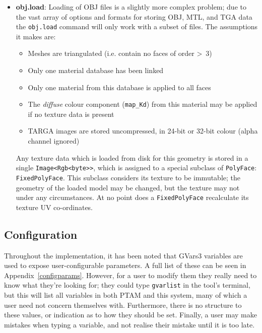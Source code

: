 \documentclass[a4paper,10pt]{article}
\begin{document}
\begin{itemize}
\item{\textbf{obj.load}: Loading of OBJ files is a slightly more complex problem; due to the vast array of options and formats for storing OBJ, MTL, and TGA data the \texttt{obj.load} command will only work with a subset of files. The assumptions it makes are:
\begin{itemize}
\item{Meshes are triangulated (i.e. contain no faces of order \textgreater~3)}
\item{Only one material database has been linked}
\item{Only one material from this database is applied to all faces}
\item{The \textit{diffuse} colour component (\texttt{map\_Kd}) from this material may be applied if no texture data is present}
\item{TARGA images are stored uncompressed, in 24-bit or 32-bit colour (alpha channel ignored)}
\end{itemize}

Any texture data which is loaded from disk for this geometry is stored in a single \texttt{Image\textless Rgb\textless byte\textgreater \textgreater}, which is assigned to a special subclass of \texttt{PolyFace}: \texttt{FixedPolyFace}. This subclass considers its texture to be immutable; the geometry of the loaded model may be changed, but the texture may not under any circumstances. At no point does a \texttt{FixedPolyFace} recalculate its texture UV co-ordinates.
}
\end{itemize}

\subsection{Configuration}
Throughout the implementation, it has been noted that GVars3 variables are used to expose user-configurable parameters. A full list of these can be seen in Appendix~\ref{configparams}. However, for a user to modify them they really need to know what they're looking for; they could type \texttt{gvarlist} in the tool's terminal, but this will list all variables in both PTAM and this system, many of which a user need not concern themselves with. Furthermore, there is no structure to these values, or indication as to how they should be set. Finally, a user may make mistakes when typing a variable, and not realise their mistake until it is too late.
\end{document}
